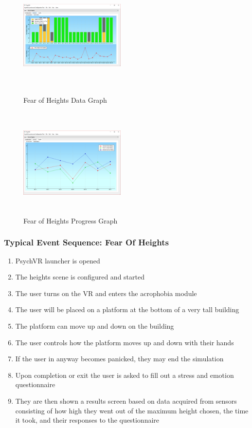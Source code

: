\documentclass[a4paper,10pt]{article}
\begin{document}
\begin{figure}[H]
	\centering
	\begin{minipage}{0.45\textwidth}
		\centering
		\includegraphics[width=200px, height=210px, keepaspectratio]{qtHeightGraph.png}
		\caption{Fear of Heights Data Graph}
		\label{fig:heightQtGraph}
	\end{minipage}\hfill
	\begin{minipage}{0.45\textwidth}
		\centering
		\includegraphics[width=200px, height=210px, keepaspectratio]{qtHeightProgress.png}
		\caption{Fear of Heights Progress Graph}
		\label{fig:heightQtSurveyResults}
	\end{minipage}
\end{figure}

\subsubsection{Typical Event Sequence: Fear Of Heights}
\begin{enumerate}
	\item PsychVR launcher is opened
	\item The heights scene is configured and started
	\item The user turns on the VR and enters the acrophobia module
	\item The user will be placed on a platform at the bottom of a very tall building
	\item The platform can move up and down on the building
	\item The user controls how the platform moves up and down with their hands
	\item If the user in anyway becomes panicked, they may end the simulation
	\item Upon completion or exit the user is asked to fill out a stress and emotion questionnaire
	\item They are then shown a results screen based on data acquired from sensors consisting of how high they went out of the maximum height chosen, the time it took, and their responses to the questionnaire
\end{enumerate}
\pagebreak
\end{document}
